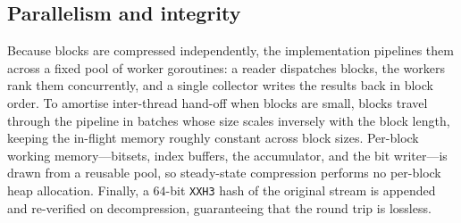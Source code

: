 \documentclass[entropy,article,submit,oneauthor,pdftex]{Definitions/mdpi}
\begin{document}
\subsection{Parallelism and integrity}
Because blocks are compressed independently, the implementation pipe\-lines them
across a fixed pool of worker goroutines: a reader dispatches blocks, the
workers rank them concurrently, and a single collector writes the results back in
block order. To amortise inter-thread hand-off when blocks are small, blocks
travel through the pipeline in batches whose size scales inversely with the
block length, keeping the in-flight memory roughly constant across block sizes.
Per-block working memory---bitsets, index buffers, the accumulator, and the bit
writer---is drawn from a reusable pool, so steady-state compression performs no
per-block heap allocation. Finally, a $64$-bit \texttt{XXH3} hash of the
original stream is appended and re-verified on decompression, guaranteeing that
the round trip is lossless.
\end{document}
